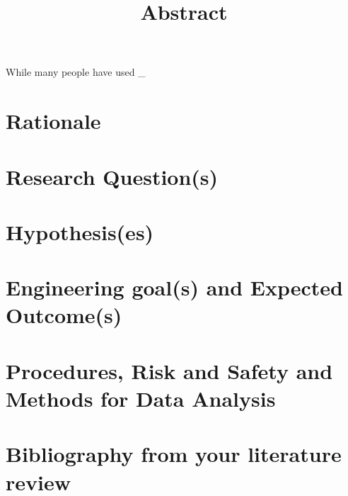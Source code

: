\documentclass[12pt]{article}
\begin{document}
\title{Abstract}
\date{\vspace{-5ex}}
\maketitle

While many people have used \_
\section{Rationale}
\blindtext

\section{Research Question(s)}
\blindtext

\section{Hypothesis(es)}
\blindtext

\section{Engineering goal(s) and Expected Outcome(s)}
\blindtext

\section{Procedures, Risk and Safety and Methods for Data Analysis}
\blindtext

\section{Bibliography from your literature review}
\blindtext

\printbibliography
\end{document}
